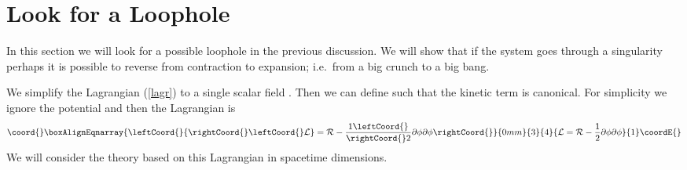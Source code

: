 \documentclass[a4paper,12pt,oneside]{article}
\begin{document}
\setcounter{equation}{0}
\section{Look for a Loophole}

In this section we will look for a possible loophole in the
previous discussion.  We will show that if the system goes
through a singularity perhaps it is possible to reverse from
contraction to expansion; i.e.\ from a big crunch to a big bang.

We simplify the Lagrangian (\ref{lagr}) to a single scalar field
\myHighlight{$\phi$}\coordHE{}.  Then we can define \myHighlight{$\phi$}\coordHE{} such that the kinetic term is
canonical.  For simplicity we ignore the potential and then the
Lagrangian is
\begin{eqnarray}\coord{}\boxAlignEqnarray{\leftCoord{}
{\rightCoord{}\leftCoord{}\cal L}={\cal R}-{1\leftCoord{}\over\rightCoord{} 2} \partial \phi\partial \phi
\label{simlag}
\rightCoord{}}{0mm}{3}{4}{
{\cal L}={\cal R}-{1\over 2} \partial \phi\partial \phi
}{1}\coordE{}\end{eqnarray}
We will consider the theory based on this Lagrangian in \coordHE{}
spacetime dimensions.
\end{document}
